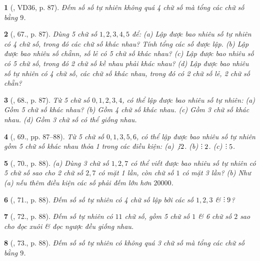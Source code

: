 \documentclass{article}
\newtheorem{baitoan}{}
\DeclareRobustCommand{\divby}{%
	\mathrel{\vbox{\baselineskip.65ex\lineskiplimit0pt\hbox{.}\hbox{.}\hbox{.}}}%
}
\begin{document}
\begin{baitoan}[\cite{Binh_Toan_6_tap_2}, VD36, p. 87]
	Đếm số số tự nhiên không quá 4 chữ số mà tổng các chữ số bằng $9$.
\end{baitoan}

\begin{baitoan}[\cite{Binh_Toan_6_tap_2}, 67., p. 87]
	Dùng 5 chữ số $1,2,3,4,5$ để: (a) Lập được bao nhiêu số tự nhiên có 4 chữ số, trong đó các chữ số khác nhau? Tính tổng các số được lập. (b) Lập được bao nhiêu số chẵnn, số lẻ có 5 chữ số khác nhau? (c) Lập được bao nhiêu số có 5 chữ số, trong đó 2 chữ số kề nhau phải khác nhau? (d) Lập được bao nhiêu số tự nhiên có 4 chữ số, các chữ số khác nhau, trong đó có 2 chữ số lẻ, 2 chữ số chẵn?
\end{baitoan}

\begin{baitoan}[\cite{Binh_Toan_6_tap_2}, 68., p. 87]
	Từ 5 chữ số $0,1,2,3,4$, có thể lập được bao nhiêu số tự nhiên: (a) Gồm 5 chữ số khác nhau? (b) Gồm 4 chữ số khác nhau. (c) Gồm 3 chữ số khác nhau. (d) Gồm 3 chữ số có thể giống nhau.
\end{baitoan}

\begin{baitoan}[\cite{Binh_Toan_6_tap_2}, 69., pp. 87--88]
	Từ 5 chữ số $0,1,3,5,6$, có thể lập được bao nhiêu số tự nhiên gồm 5 chữ số khác nhau thỏa 1 trong các điều kiện: (a) $\not{\divby}2$. (b) $\divby2$. (c) $\divby5$.
\end{baitoan}

\begin{baitoan}[\cite{Binh_Toan_6_tap_2}, 70., p. 88]
	(a) Dùng 3 chữ số $1,2,7$ có thể viết được bao nhiêu số tự nhiên có 5 chữ số sao cho 2 chữ số $2,7$ có mặt 1 lần, còn chữ số $1$ có mặt 3 lần? (b) Như (a) nếu thêm điều kiện các số phải đếm lớn hơn $20000$.
\end{baitoan}

\begin{baitoan}[\cite{Binh_Toan_6_tap_2}, 71., p. 88]
	Đếm số số tự nhiên có 4 chữ số lập bởi các số $1,2,3$ \& $\divby9$?
\end{baitoan}

\begin{baitoan}[\cite{Binh_Toan_6_tap_2}, 72., p. 88]
	Đếm số tự nhiên có $11$ chữ số, gồm 5 chữ số $1$ \& 6 chữ số $2$ sao cho đọc xuôi \& đọc ngược đều giống nhau.
\end{baitoan}

\begin{baitoan}[\cite{Binh_Toan_6_tap_2}, 73., p. 88]
	Đếm số số tự nhiên có không quá 3 chữ số mà tổng các chữ số bằng $9$.
\end{baitoan}
\end{document}
